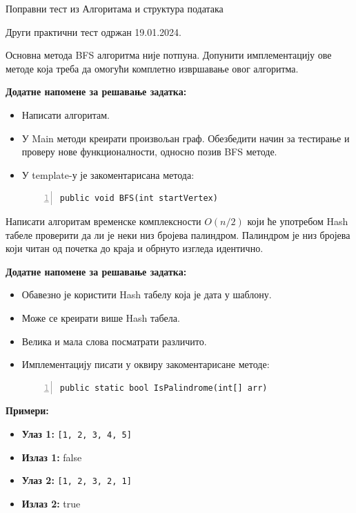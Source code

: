 
Поправни тест из Алгоритама и структура података

Други практични тест одржан 19.01.2024.

Основна метода BFS алгоритма није потпуна. Допунити имплементацију ове методе која треба да омогући комплетно извршавање овог алгоритма.

\textbf{Додатне напомене за решавање задатка:}
\begin{itemize}
	\item Написати алгоритам.
	\item У Main методи креирати произвољан граф. Обезбедити начин за тестирање и проверу нове функционалности, односно позив BFS методе.
	\item У template-у је закоментарисана метода:
	\begin{Verbatim}[fontsize=\footnotesize, numbers=left, xleftmargin=10mm]
public void BFS(int startVertex)
	\end{Verbatim}
\end{itemize}



Написати алгоритам временске комплексности $O(n/2)$ који ће употребом Hash табеле проверити да ли је неки низ бројева палиндром. Палиндром је низ бројева који читан од почетка до краја и обрнуто изгледа идентично.

\textbf{Додатне напомене за решавање задатка:}
\begin{itemize}
	\item Обавезно је користити Hash табелу која је дата у шаблону.
	\item Може се креирати више Hash табела.
	\item Велика и мала слова посматрати различито.
	\item Имплементацију писати у оквиру закоментарисане методе:
	\begin{Verbatim}[fontsize=\footnotesize, numbers=left, xleftmargin=10mm]
public static bool IsPalindrome(int[] arr)
	\end{Verbatim}
\end{itemize}

\textbf{Примери:}
\begin{itemize}
	\item \textbf{Улаз 1:} \texttt{[1, 2, 3, 4, 5]}
	\item \textbf{Излаз 1:} false
	\item \textbf{Улаз 2:} \texttt{[1, 2, 3, 2, 1]}
	\item \textbf{Излаз 2:} true
\end{itemize}



